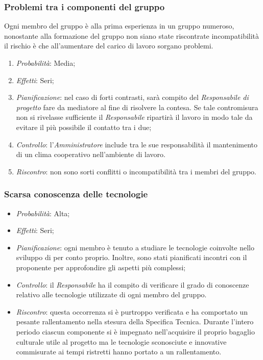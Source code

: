 		\subsubsection{Problemi tra i componenti del gruppo}

Ogni membro del gruppo è alla prima esperienza in un gruppo numeroso, nonostante alla formazione del gruppo non siano state riscontrate incompatibilità il rischio è che all'aumentare del carico di lavoro sorgano problemi.		
\begin{enumerate}
\item \textit{Probabilità}: Media;
\item \textit{Effetti}: Seri;
\item \textit{Pianificazione}: nel caso di forti contrasti, sarà compito del \textit{Responsabile di progetto} fare da mediatore al fine di risolvere la contesa. Se tale contromisura non si rivelasse sufficiente il \textit{Responsabile} ripartirà il lavoro in modo tale da evitare il più possibile il contatto tra i due;
\item \textit{Controllo}: l'\textit{Amministratore} include tra le sue responsabilità il mantenimento di un clima cooperativo nell'ambiente di lavoro.
\item \textit{Riscontro}: non sono sorti conflitti o incompatibilità tra i membri del gruppo.
\end{enumerate}	
		
		\subsubsection{Scarsa conoscenza delle tecnologie}
		
\begin{itemize}
\item \textit{Probabilità}: Alta;
\item \textit{Effetti}: Seri;
\item \textit{Pianificazione}: ogni membro è tenuto a studiare le tecnologie coinvolte nello sviluppo di \ProjectName{} per conto proprio. Inoltre, sono stati pianificati incontri con il proponente per approfondire gli aspetti più complessi;
\item \textit{Controllo}: il \textit{Responsabile} ha il compito di verificare il grado di conoscenze relativo alle tecnologie utilizzate di ogni membro del gruppo.
\item \textit{Riscontro}: questa occorrenza si è purtroppo verificata e ha comportato un pesante rallentamento nella stesura della Specifica Tecnica. Durante l'intero periodo ciascun componente si è impegnato nell'acquisire il proprio bagaglio culturale utile al progetto ma le tecnologie sconosciute e innovative commisurate ai tempi ristretti hanno portato a un rallentamento.
\end{itemize}	


